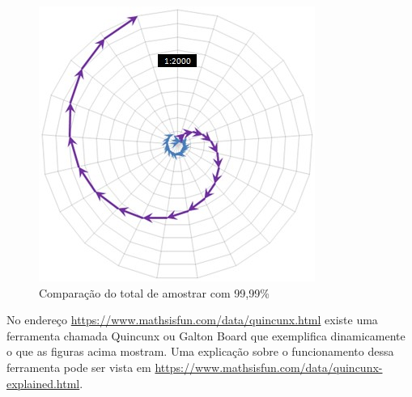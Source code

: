 \begin{figure}[H]
\caption{Comparação do total de amostrar com 99,99\% }
\label{fig:total_comparison_chart_with_99_range}
\centering
\includegraphics[scale=1]{sections/images/total_comparison_chart_with_99_range.jpg}
\end{figure}

No endereço \url{https://www.mathsisfun.com/data/quincunx.html} existe uma ferramenta chamada Quincunx ou Galton Board que exemplifica dinamicamente o que as figuras acima mostram. Uma explicação sobre o funcionamento dessa ferramenta pode ser vista em \url{https://www.mathsisfun.com/data/quincunx-explained.html}. 